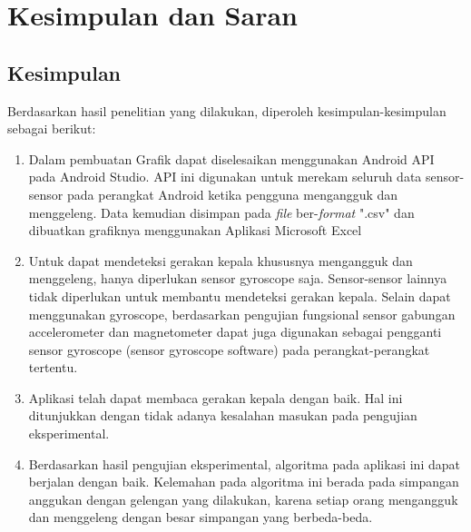 \chapter{Kesimpulan dan Saran}
\label{chap:kesimpulan_dan_saran}

\section{Kesimpulan}
\label{sec:kesimpulan}
Berdasarkan hasil penelitian yang dilakukan, diperoleh kesimpulan-kesimpulan sebagai berikut:

\begin{enumerate}
    \item Dalam pembuatan Grafik dapat diselesaikan menggunakan Android API pada Android Studio. API ini digunakan untuk merekam seluruh data sensor-sensor pada perangkat Android ketika pengguna mengangguk dan menggeleng. Data kemudian disimpan pada \textit{file} ber-\textit{format} ".csv" dan dibuatkan grafiknya menggunakan Aplikasi Microsoft Excel
    \item Untuk dapat mendeteksi gerakan kepala khususnya mengangguk dan menggeleng, hanya diperlukan sensor gyroscope saja. Sensor-sensor lainnya tidak diperlukan untuk membantu mendeteksi gerakan kepala. Selain dapat menggunakan gyroscope, berdasarkan pengujian fungsional sensor gabungan accelerometer dan magnetometer dapat juga digunakan sebagai pengganti sensor gyroscope (sensor gyroscope software) pada perangkat-perangkat tertentu. 
    \item Aplikasi telah dapat membaca gerakan kepala dengan baik. Hal ini ditunjukkan dengan tidak adanya kesalahan masukan pada pengujian eksperimental. 
    \item Berdasarkan hasil pengujian eksperimental, algoritma pada aplikasi ini dapat berjalan dengan baik. Kelemahan pada algoritma ini berada pada simpangan anggukan dengan gelengan yang dilakukan, karena setiap orang mengangguk dan menggeleng dengan besar simpangan yang berbeda-beda.
\end{enumerate}


